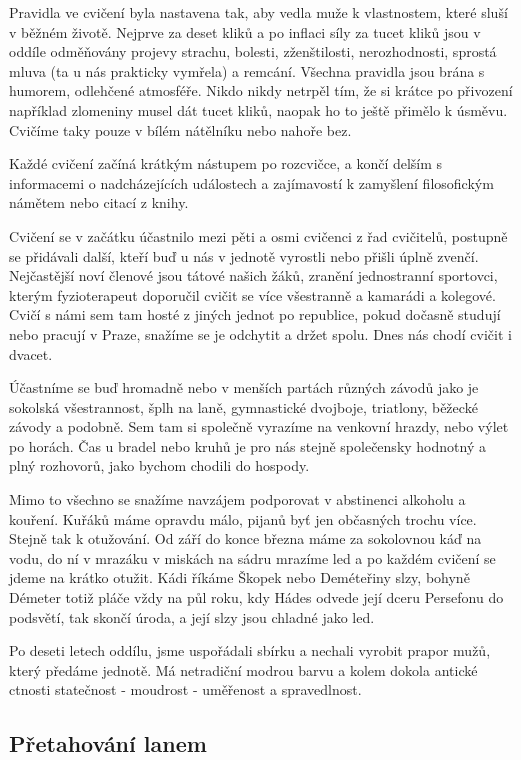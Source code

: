 Pravidla ve cvičení byla nastavena tak, aby vedla muže k vlastnostem,
které sluší v běžném životě. Nejprve za deset kliků a po inflaci síly za
tucet kliků jsou v oddíle odměňovány projevy strachu, bolesti,
zženštilosti, nerozhodnosti, sprostá mluva (ta u nás prakticky vymřela)
a remcání. Všechna pravidla jsou brána s humorem, odlehčené atmosféře.
Nikdo nikdy netrpěl tím, že si krátce po přivození například zlomeniny
musel dát tucet kliků, naopak ho to ještě přimělo k úsměvu. Cvičíme taky
pouze v bílém nátělníku nebo nahoře bez.

Každé cvičení začíná krátkým nástupem po rozcvičce, a končí delším s
informacemi o nadcházejících událostech a zajímavostí k zamyšlení
filosofickým námětem nebo citací z knihy.

Cvičení se v začátku účastnilo mezi pěti a osmi cvičenci z řad
cvičitelů, postupně se přidávali další, kteří buď u nás v jednotě
vyrostli nebo přišli úplně zvenčí. Nejčastější noví členové jsou tátové
našich žáků, zranění jednostranní sportovci, kterým fyzioterapeut
doporučil cvičit se více všestranně a kamarádi a kolegové. Cvičí s námi
sem tam hosté z jiných jednot po republice, pokud dočasně studují nebo
pracují v Praze, snažíme se je odchytit a držet spolu. Dnes nás chodí
cvičit i dvacet.

Účastníme se buď hromadně nebo v menších partách různých závodů jako je
sokolská všestrannost, šplh na laně, gymnastické dvojboje, triatlony,
běžecké závody a podobně. Sem tam si společně vyrazíme na venkovní
hrazdy, nebo výlet po horách. Čas u bradel nebo kruhů je pro nás stejně
společensky hodnotný a plný rozhovorů, jako bychom chodili do hospody.

Mimo to všechno se snažíme navzájem podporovat v abstinenci alkoholu a
kouření. Kuřáků máme opravdu málo, pijanů byť jen občasných trochu více.
Stejně tak k otužování. Od září do konce března máme za sokolovnou káď
na vodu, do ní v mrazáku v miskách na sádru mrazíme led a po každém
cvičení se jdeme na krátko otužit. Kádi říkáme Škopek nebo Deméteřiny
slzy, bohyně Démeter totiž pláče vždy na půl roku, kdy Hádes odvede její
dceru Persefonu do podsvětí, tak skončí úroda, a její slzy jsou chladné
jako led.

Po deseti letech oddílu, jsme uspořádali sbírku a nechali vyrobit prapor
mužů, který předáme jednotě. Má netradiční modrou barvu a kolem dokola
antické ctnosti statečnost - moudrost - uměřenost a spravedlnost.

\subsection{Přetahování lanem}\label{pux159etahovuxe1nuxed-lanem}

